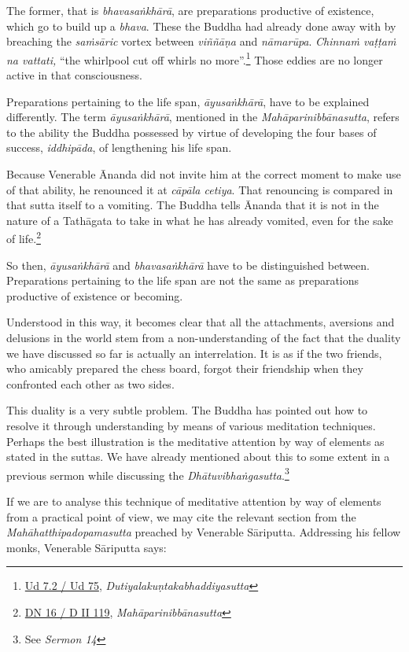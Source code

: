The former, that is \emph{bhavasaṅkhārā}, are preparations productive of existence, which go to build up a \emph{bhava}. These the Buddha had already done away with by breaching the \emph{saṁsāric} vortex between \emph{viññāṇa} and \emph{nāmarūpa}. \emph{Chinnaṁ vaṭṭaṁ na vattati,} ``the whirlpool cut off whirls no more''.\footnote{\href{https://suttacentral.net/ud7.2/pli/ms}{Ud 7.2 / Ud 75}, \emph{Dutiyalakuṇtakabhaddiyasutta}} Those eddies are no longer active in that consciousness.

Preparations pertaining to the life span, \emph{āyusaṅkhārā}, have to be explained differently. The term \emph{āyusaṅkhārā}, mentioned in the \emph{Mahāparinibbānasutta}, refers to the ability the Buddha possessed by virtue of developing the four bases of success, \emph{iddhipāda}, of lengthening his life span.

Because Venerable Ānanda did not invite him at the correct moment to make use of that ability, he renounced it at \emph{cāpāla cetiya}. That renouncing is compared in that sutta itself to a vomiting. The Buddha tells Ānanda that it is not in the nature of a Tathāgata to take in what he has already vomited, even for the sake of life.\footnote{\href{https://suttacentral.net/dn16/pli/ms}{DN 16 / D II 119}, \emph{Mahāparinibbānasutta}}

So then, \emph{āyusaṅkhārā} and \emph{bhavasaṅkhārā} have to be distinguished between. Preparations pertaining to the life span are not the same as preparations productive of existence or becoming.

Understood in this way, it becomes clear that all the attachments, aversions and delusions in the world stem from a non-understanding of the fact that the duality we have discussed so far is actually an interrelation. It is as if the two friends, who amicably prepared the chess board, forgot their friendship when they confronted each other as two sides.

This duality is a very subtle problem. The Buddha has pointed out how to resolve it through understanding by means of various meditation techniques. Perhaps the best illustration is the meditative attention by way of elements as stated in the suttas. We have already mentioned about this to some extent in a previous sermon while discussing the \emph{Dhātuvibhaṅgasutta}.\footnote{See \emph{Sermon 14}}

\clearpage

If we are to analyse this technique of meditative attention by way of elements from a practical point of view, we may cite the relevant section from the \emph{Mahāhatthipadopamasutta} preached by Venerable Sāriputta. Addressing his fellow monks, Venerable Sāriputta says:

